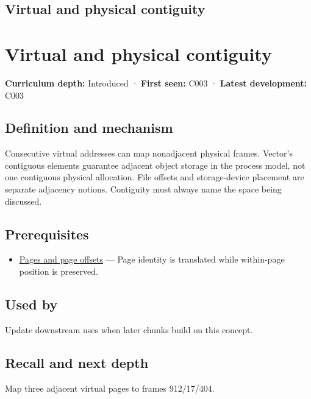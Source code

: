\hypertarget{appendix-f897c1ddac8f}{}
\section*{Virtual and physical contiguity}
\chapter{Virtual and physical contiguity}\label{appendix-f897c1ddac8f-virtual-and-physical-contiguity}

\textbf{Curriculum depth:} Introduced · \textbf{First seen:} C003 · \textbf{Latest development:} C003

\section{Definition and mechanism}\label{appendix-f897c1ddac8f-definition-and-mechanism}

Consecutive virtual addresses can map nonadjacent physical frames. Vector's contiguous elements guarantee adjacent object storage in the process model, not one contiguous physical allocation. File offsets and storage-device placement are separate adjacency notions. Contiguity must always name the space being discussed.

\section{Prerequisites}\label{appendix-f897c1ddac8f-prerequisites}

\begin{itemize}
\tightlist
\item
  \hyperref[appendix-0c67cd5bf30a]{Pages and page offsets} --- Page identity is translated while within-page position is preserved.
\end{itemize}

\section{Used by}\label{appendix-f897c1ddac8f-used-by}

Update downstream uses when later chunks build on this concept.

\section{Recall and next depth}\label{appendix-f897c1ddac8f-recall-and-next-depth}

Map three adjacent virtual pages to frames 912/17/404.

